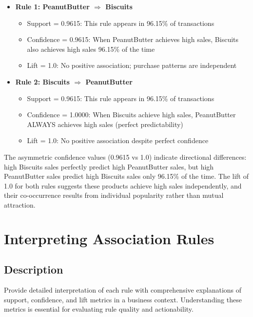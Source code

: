 \documentclass[12pt,a4paper]{article}
\begin{document}
\begin{itemize}
    \item \textbf{Rule 1: PeanutButter $\Rightarrow$ Biscuits}
    \begin{itemize}
        \item Support = 0.9615: This rule appears in 96.15\% of transactions
        \item Confidence = 0.9615: When PeanutButter achieves high sales, Biscuits also achieves high sales 96.15\% of the time
        \item Lift = 1.0: No positive association; purchase patterns are independent
    \end{itemize}
    
    \item \textbf{Rule 2: Biscuits $\Rightarrow$ PeanutButter}
    \begin{itemize}
        \item Support = 0.9615: This rule appears in 96.15\% of transactions
        \item Confidence = 1.0000: When Biscuits achieve high sales, PeanutButter ALWAYS achieves high sales (perfect predictability)
        \item Lift = 1.0: No positive association despite perfect confidence
    \end{itemize}
\end{itemize}

The asymmetric confidence values (0.9615 vs 1.0) indicate directional differences: high Biscuits sales perfectly predict high PeanutButter sales, but high PeanutButter sales predict high Biscuits sales only 96.15\% of the time. The lift of 1.0 for both rules suggests these products achieve high sales independently, and their co-occurrence results from individual popularity rather than mutual attraction.



\section{Interpreting Association Rules}

\subsection{Description}
Provide detailed interpretation of each rule with comprehensive explanations of support, confidence, and lift metrics in a business context. Understanding these metrics is essential for evaluating rule quality and actionability.
\end{document}
